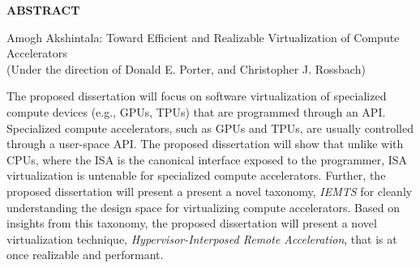\begin{center}
\vspace*{52pt}
{\normalfont\textbf{ABSTRACT}}
\vspace{11pt}

\begin{singlespace}
Amogh Akshintala: Toward Efficient and Realizable Virtualization of Compute Accelerators \\
(Under the direction of Donald E. Porter, and Christopher J. Rossbach)
\end{singlespace}
\end{center}

The proposed dissertation will focus on software virtualization of
specialized compute devices (e.g., GPUs, TPUs) that are programmed through an
API. Specialized compute accelerators, such as GPUs and TPUs, are usually
controlled through a user-space API.
The proposed dissertation will show that unlike with CPUs, where the ISA is
the canonical interface exposed to the programmer, ISA virtualization is
untenable for specialized compute accelerators. Further, the proposed
dissertation will present a present a novel taxonomy, \emph{IEMTS} for cleanly
understanding the design space for virtualizing compute accelerators.
Based on insights from this taxonomy, the proposed dissertation will
present a novel virtualization technique, \emph{Hypervisor-Interposed Remote
Acceleration}, that is at once realizable and performant.

\clearpage
